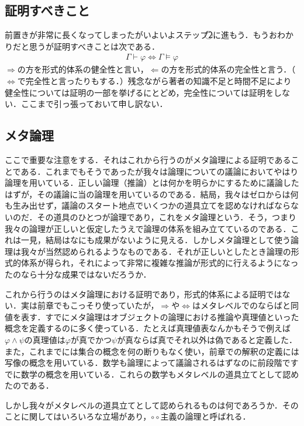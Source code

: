 \documentclass[10pt,b5paper,papersize,dvipdfmx]{jsbook}
\begin{document}
\subsection{証明すべきこと}
前置きが非常に長くなってしまったがいよいよステップ\textcircled{\scriptsize 2}に進もう．もうおわかりだと思うが証明すべきことは次である．
\begin{align}
\Gamma \vdash \varphi \Leftrightarrow \Gamma \models \varphi
\end{align}
$\Rightarrow$の方を形式的体系の健全性と言い，$\Leftarrow$の方を形式的体系の完全性と言う．（$\Leftrightarrow$で完全性と言ったりもする．）残念ながら著者の知識不足と時間不足により健全性については証明の一部を挙げるにとどめ，完全性については証明をしない．ここまで引っ張っておいて申し訳ない．
\subsection{メタ論理}
ここで重要な注意をする．それはこれから行うのがメタ論理による証明であることである．これまでもそうであったが我々は論理についての議論においてやはり論理を用いている．正しい論理（推論）とは何かを明らかにするために議論したはずが，その議論に当の論理を用いているのである．結局，我々はゼロからは何も生み出せず，議論のスタート地点でいくつかの道具立てを認めなければならないのだ．その道具のひとつが論理であり，これをメタ論理という．そう，つまり我々の論理が正しいと仮定したうえで論理の体系を組み立てているのである．これは一見，結局はなにも成果がないように見える．しかしメタ論理として使う論理は我々が当然認められるようなものである．それが正しいとしたとき論理の形式的体系が得られ，それによって非常に複雑な推論が形式的に行えるようになったのなら十分な成果ではないだろうか．\par
これから行うのはメタ論理における証明であり，形式的体系による証明ではない．実は前章でもこっそり使っていたが，$\Rightarrow$や$\Leftrightarrow$はメタレベルでのならばと同値を表す．すでにメタ論理はオブジェクトの論理における推論や真理値といった概念を定義するのに多く使っている．たとえば真理値表なんかもそうで例えば$\varphi \land \psi$の真理値は$\varphi$が真でかつ$\psi$が真ならば真でそれ以外は偽であると定義した．また，これまでには集合の概念を何の断りもなく使い，前章での解釈の定義には写像の概念を用いている．数学も論理によって議論されるはずなのに前段階ですでに数学の概念を用いている．これらの数学もメタレベルの道具立てとして認めたのである．\par
しかし我々がメタレベルの道具立てとして認められるものは何であろうか．そのことに関してはいろいろな立場があり，$\circ \circ$主義の論理と呼ばれる．\par
\end{document}
